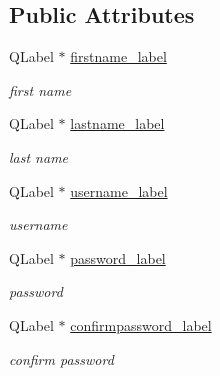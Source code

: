 \subsection*{Public Attributes}
\begin{DoxyCompactItemize}
\item 
\mbox{\label{classsignupwidget_a70b0a263832731e4ad62f234cd81915d}} 
Q\+Label $\ast$ \hyperlink{classsignupwidget_a70b0a263832731e4ad62f234cd81915d}{firstname\+\_\+label}
\begin{DoxyCompactList}\small\item\em first name \end{DoxyCompactList}\item 
\mbox{\label{classsignupwidget_aade83bff48e4a9b31bd62482d859901d}} 
Q\+Label $\ast$ \hyperlink{classsignupwidget_aade83bff48e4a9b31bd62482d859901d}{lastname\+\_\+label}
\begin{DoxyCompactList}\small\item\em last name \end{DoxyCompactList}\item 
\mbox{\label{classsignupwidget_a274b82c9dec7bcd59f68b98353cec293}} 
Q\+Label $\ast$ \hyperlink{classsignupwidget_a274b82c9dec7bcd59f68b98353cec293}{username\+\_\+label}
\begin{DoxyCompactList}\small\item\em username \end{DoxyCompactList}\item 
\mbox{\label{classsignupwidget_a7776231c96582c1136e5d640612415e3}} 
Q\+Label $\ast$ \hyperlink{classsignupwidget_a7776231c96582c1136e5d640612415e3}{password\+\_\+label}
\begin{DoxyCompactList}\small\item\em password \end{DoxyCompactList}\item 
\mbox{\label{classsignupwidget_a6c9efac1ba4ca981bec439e56d5b968b}} 
Q\+Label $\ast$ \hyperlink{classsignupwidget_a6c9efac1ba4ca981bec439e56d5b968b}{confirmpassword\+\_\+label}
\begin{DoxyCompactList}\small\item\em confirm password \end{DoxyCompactList}\item 

\end{DoxyCompactItemize}
